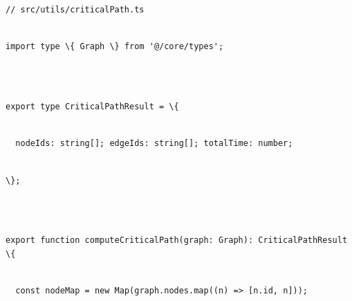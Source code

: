 \documentclass[
]{article}
\newcommand{\passthrough}[1]{#1}
\begin{document}
\passthrough{\lstinline!//!}\passthrough{\lstinline! !}\passthrough{\lstinline!src!}\passthrough{\lstinline!/!}\passthrough{\lstinline!utils!}\passthrough{\lstinline!/!}\passthrough{\lstinline!criticalPath!}\passthrough{\lstinline!.!}\passthrough{\lstinline!ts!}\strut \\
\passthrough{\lstinline!import!}\passthrough{\lstinline! !}\passthrough{\lstinline!type!}\passthrough{\lstinline! !}\passthrough{\lstinline!\{!}\passthrough{\lstinline! !}\passthrough{\lstinline!Graph!}\passthrough{\lstinline! !}\passthrough{\lstinline!\}!}\passthrough{\lstinline! !}\passthrough{\lstinline!from!}\passthrough{\lstinline! !}\passthrough{\lstinline!'@/!}\passthrough{\lstinline!core!}\passthrough{\lstinline!/!}\passthrough{\lstinline!types!}\passthrough{\lstinline!';!}\strut \\
\strut \\
\passthrough{\lstinline!export!}\passthrough{\lstinline! !}\passthrough{\lstinline!type!}\passthrough{\lstinline! !}\passthrough{\lstinline!CriticalPathResult!}\passthrough{\lstinline! !}\passthrough{\lstinline!=!}\passthrough{\lstinline! !}\passthrough{\lstinline!\{!}\strut \\
\passthrough{\lstinline!  !}\passthrough{\lstinline!nodeIds!}\passthrough{\lstinline!:!}\passthrough{\lstinline! !}\passthrough{\lstinline!string!}\passthrough{\lstinline![];!}\passthrough{\lstinline! !}\passthrough{\lstinline!edgeIds!}\passthrough{\lstinline!:!}\passthrough{\lstinline! !}\passthrough{\lstinline!string!}\passthrough{\lstinline![];!}\passthrough{\lstinline! !}\passthrough{\lstinline!totalTime!}\passthrough{\lstinline!:!}\passthrough{\lstinline! !}\passthrough{\lstinline!number!}\passthrough{\lstinline!;!}\strut \\
\passthrough{\lstinline!\};!}\strut \\
\strut \\
\passthrough{\lstinline!export!}\passthrough{\lstinline! !}\passthrough{\lstinline!function!}\passthrough{\lstinline! !}\passthrough{\lstinline!computeCriticalPath!}\passthrough{\lstinline!(!}\passthrough{\lstinline!graph!}\passthrough{\lstinline!:!}\passthrough{\lstinline! !}\passthrough{\lstinline!Graph!}\passthrough{\lstinline!):!}\passthrough{\lstinline! !}\passthrough{\lstinline!CriticalPathResult!}\passthrough{\lstinline! !}\passthrough{\lstinline!\{!}\strut \\
\passthrough{\lstinline!  !}\passthrough{\lstinline!const!}\passthrough{\lstinline! !}\passthrough{\lstinline!nodeMap!}\passthrough{\lstinline! !}\passthrough{\lstinline!=!}\passthrough{\lstinline! !}\passthrough{\lstinline!new!}\passthrough{\lstinline! !}\passthrough{\lstinline!Map!}\passthrough{\lstinline!(!}\passthrough{\lstinline!graph!}\passthrough{\lstinline!.!}\passthrough{\lstinline!nodes!}\passthrough{\lstinline!.!}\passthrough{\lstinline!map!}\passthrough{\lstinline!((!}\passthrough{\lstinline!n!}\passthrough{\lstinline!)!}\passthrough{\lstinline! !}\passthrough{\lstinline!=>!}\passthrough{\lstinline! !}\passthrough{\lstinline![!}\passthrough{\lstinline!n!}\passthrough{\lstinline!.!}\passthrough{\lstinline!id!}\passthrough{\lstinline!,!}\passthrough{\lstinline! !}\passthrough{\lstinline!n!}\passthrough{\lstinline!]));!}\strut \\
\end{document}
